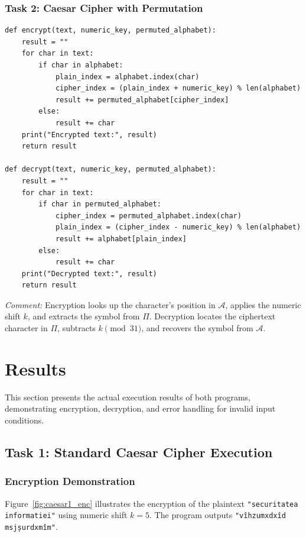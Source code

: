\documentclass{labreport}
\begin{document}
\subsubsection{Task 2: Caesar Cipher with Permutation}
\begin{lstlisting}[style=python]
def encrypt(text, numeric_key, permuted_alphabet):
    result = ""
    for char in text:
        if char in alphabet:
            plain_index = alphabet.index(char)
            cipher_index = (plain_index + numeric_key) % len(alphabet)
            result += permuted_alphabet[cipher_index]
        else:
            result += char
    print("Encrypted text:", result)
    return result

def decrypt(text, numeric_key, permuted_alphabet):
    result = ""
    for char in text:
        if char in permuted_alphabet:
            cipher_index = permuted_alphabet.index(char)
            plain_index = (cipher_index - numeric_key) % len(alphabet)
            result += alphabet[plain_index]
        else:
            result += char
    print("Decrypted text:", result)
    return result
\end{lstlisting}
\textit{Comment:} Encryption looks up the character's position in $\mathcal{A}$, applies the numeric shift $k$, and extracts the symbol from $\Pi$. Decryption locates the ciphertext character in $\Pi$, subtracts $k \pmod{31}$, and recovers the symbol from $\mathcal{A}$.

\newpage

\section{Results}

This section presents the actual execution results of both programs, demonstrating encryption, decryption, and error handling for invalid input conditions.

\subsection{Task 1: Standard Caesar Cipher Execution}

\subsubsection{Encryption Demonstration}
Figure~\ref{fig:caesar1_enc} illustrates the encryption of the plaintext \texttt{"securitatea informatiei"} using numeric shift $k = 5$. The program outputs \texttt{"vîhzumxdxîd msjșurdxmîm"}.
\end{document}
